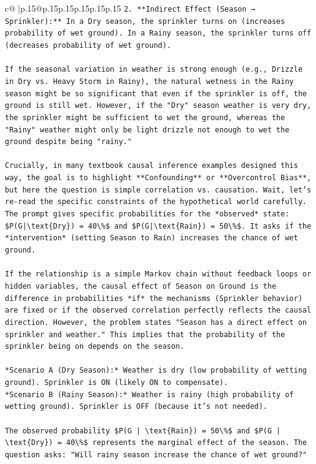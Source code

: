 \documentclass{article}
\begin{document}
{\begin{supertabular}{c@{$\;$}|p{.15\linewidth}@{}p{.15\linewidth}p{.15\linewidth}p{.15\linewidth}p{.15\linewidth}p{.15\linewidth}}
{{{\texttt{2.  **Indirect Effect (Season → Sprinkler):** In a Dry season, the sprinkler turns on (increases probability of wet ground). In a Rainy season, the sprinkler turns off (decreases probability of wet ground).} \\
\\ 
\texttt{If the seasonal variation in weather is strong enough (e.g., Drizzle in Dry vs. Heavy Storm in Rainy), the natural wetness in the Rainy season might be so significant that even if the sprinkler is off, the ground is still wet. However, if the "Dry" season weather is very dry, the sprinkler might be sufficient to wet the ground, whereas the "Rainy" weather might only be light drizzle not enough to wet the ground despite being "rainy."} \\
\\ 
\texttt{Crucially, in many textbook causal inference examples designed this way, the goal is to highlight **Confounding** or **Overcontrol Bias**, but here the question is simple correlation vs. causation. Wait, let's re{-}read the specific constraints of the hypothetical world carefully. The prompt gives specific probabilities for the *observed* state: \$P(G|\textbackslash{}text\{Dry\}) = 40\textbackslash{}\%\$ and \$P(G|\textbackslash{}text\{Rain\}) = 50\textbackslash{}\%\$. It asks if the *intervention* (setting Season to Rain) increases the chance of wet ground.} \\
\\ 
\texttt{If the relationship is a simple Markov chain without feedback loops or hidden variables, the causal effect of Season on Ground is the difference in probabilities *if* the mechanisms (Sprinkler behavior) are fixed or if the observed correlation perfectly reflects the causal direction. However, the problem states "Season has a direct effect on sprinkler and weather." This implies that the probability of the sprinkler being on depends on the season.} \\
\\ 
\texttt{*Scenario A (Dry Season):* Weather is dry (low probability of wetting ground). Sprinkler is ON (likely ON to compensate).} \\
\texttt{*Scenario B (Rainy Season):* Weather is rainy (high probability of wetting ground). Sprinkler is OFF (because it's not needed).} \\
\\ 
\texttt{The observed probability \$P(G | \textbackslash{}text\{Rain\}) = 50\textbackslash{}\%\$ and \$P(G | \textbackslash{}text\{Dry\}) = 40\textbackslash{}\%\$ represents the marginal effect of the season. The question asks: "Will rainy season increase the chance of wet ground?"} \\
}}}
\end{supertabular}}
\end{document}
